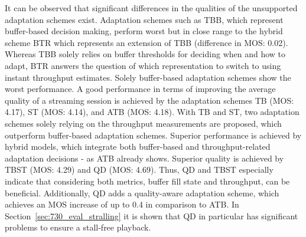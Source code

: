 It can be observed that significant differences in the qualities of the unsupported adaptation schemes exist. 
Adaptation schemes such as \ac{TBB}, which represent buffer-based decision making, perform worst but in close range to the hybrid scheme \ac{BTR} which represents an extension of \ac{TBB} (difference in \ac{MOS}: 0.02).
Whereas \ac{TBB} solely relies on buffer thresholds for deciding when and how to adapt, \ac{BTR} answers the question of  which representation to switch to using instant throughput estimates.
Solely buffer-based adaptation schemes show the worst performance.
A good performance in terms of improving the average quality of a streaming session is achieved by the adaptation schemes \ac{TB} (\ac{MOS}: 4.17), \ac{ST} (\ac{MOS}: 4.14), and \ac{ATB} (\ac{MOS}: 4.18).
With \ac{TB} and \ac{ST}, two adaptation schemes solely relying on the throughput measurements are proposed, which outperform buffer-based adaptation schemes.
Superior performance is achieved by hybrid models, which integrate both buffer-based and throughput-related adaptation decisions - as \ac{ATB} already shows.
Superior quality is achieved by \ac{TBST} (\ac{MOS}: 4.29) and \ac{QD} (\ac{MOS}: 4.69).
Thus, \ac{QD} and \ac{TBST} especially indicate that considering both metrics, buffer fill state and throughput, can be beneficial.
Additionally, \ac{QD} adds a quality-aware adaptation scheme, which achieves an \ac{MOS} increase of up to 0.4 in comparison to \ac{ATB}. 
In Section~\ref{sec:730_eval_stralling} it is shown that \ac{QD} in particular has significant problems to ensure a stall-free playback.
